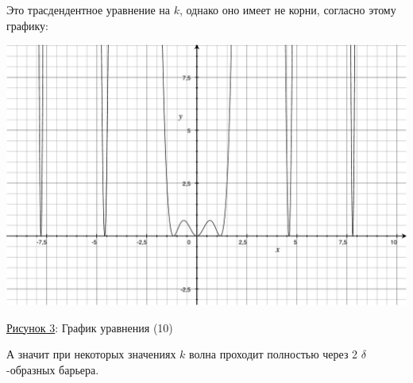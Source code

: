 \documentclass[11pt]{article}    %
\begin{document}
Это трасдендентное уравнение на $k$, однако оно имеет не корни, согласно этому графику:
\par
\begin{center}
\includegraphics[scale = 0.55]{trans_graphic.pdf}
\par
    \underline{Рисунок 3}: График уравнения (10)
\end{center}
\par А значит при некоторых значениях $k$ волна проходит полностью через 2 $\delta$-образных барьера.
\end{document}
